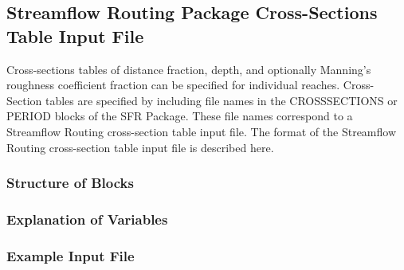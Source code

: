 \newpage
\subsection{Streamflow Routing Package Cross-Sections Table Input File}
Cross-sections tables of distance fraction, depth, and optionally Manning's roughness coefficient fraction can be specified for individual reaches.  Cross-Section tables are specified by including file names in the CROSSSECTIONS or PERIOD blocks of the SFR Package.  These file names correspond to a Streamflow Routing cross-section table input file.  The format of the Streamflow Routing cross-section table input file is described here.

\vspace{5mm}
\subsubsection{Structure of Blocks}
\vspace{5mm}



\vspace{5mm}

\vspace{5mm}
\subsubsection{Explanation of Variables}
\begin{description}

\end{description}

\subsubsection{Example Input File}


